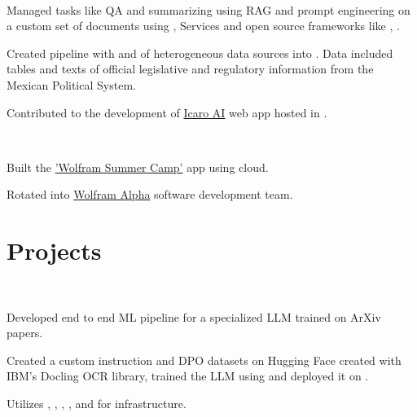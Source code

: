 \documentclass[]{tex/deedy-resume-openfont}
\begin{document}
\begin{minipage}[t]{0.66\textwidth}
\\
\begin{tightemize}
    \item Managed  tasks like QA and summarizing using RAG and prompt engineering on a custom set of documents using ,  Services and open source frameworks like \href{https://docs.llamaindex.ai/en/stable/}{}, \href{https://www.langchain.com/}{}.
    \item Created  pipeline with  and  of heterogeneous data sources into . Data included tables and texts of official legislative and regulatory information from the Mexican Political System.
    \item Contributed to the  development of \href{http://www.icaro.ai/home/}{Icaro AI} web app hosted in .
\end{tightemize}
\sectionsep

\\
\begin{tightemize}
    \item Built the \href{https://education.wolfram.com/summer-camp/}{'Wolfram Summer Camp'} app using \href{https://www.wolfram.com/wolfram-one/}{} cloud.
    \item Rotated into \href{https://www.wolframalpha.com/}{Wolfram Alpha} software development team. 
\end{tightemize}
\sectionsep


\section{Projects}

\\
\vspace{\topsep} %
\begin{tightemize}
    \item Developed end to end ML pipeline for a specialized LLM trained on ArXiv papers.
    \item Created a custom instruction and DPO datasets on Hugging Face created with IBM's Docling OCR library, trained the LLM using and deployed it on .
    \item Utilizes , , , ,  and  for infrastructure.
\end{tightemize}
\sectionsep


\end{minipage}
\end{document}
